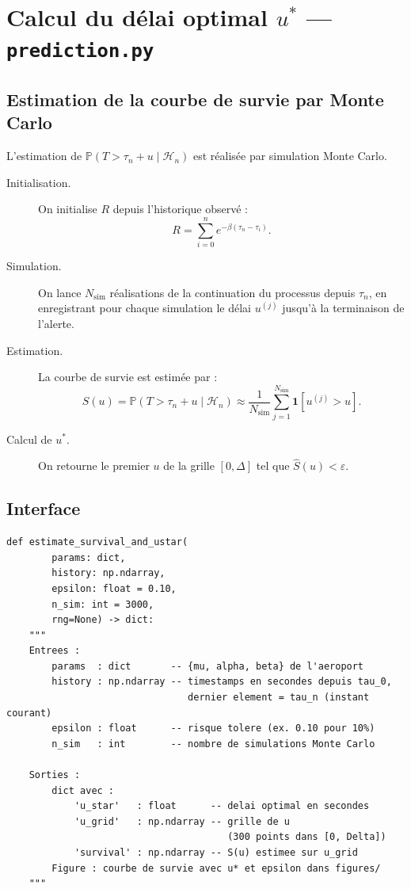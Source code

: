 \documentclass[a4paper,11pt]{article}
\begin{document}
\section{Calcul du délai optimal $u^*$ --- \texttt{prediction.py}}

\subsection{Estimation de la courbe de survie par Monte Carlo}

L'estimation de $\mathbb{P}(T > \tau_n + u \mid \mathcal{H}_n)$ est réalisée par simulation Monte Carlo.

\begin{description}
    \item[Initialisation.] On initialise $R$ depuis l'historique observé :
    \[
    R = \sum_{i=0}^{n} e^{-\beta(\tau_n - \tau_i)}.
    \]
    \item[Simulation.] On lance $N_{\text{sim}}$ réalisations de la continuation du processus depuis $\tau_n$, en enregistrant pour chaque simulation le délai $u^{(j)}$ jusqu'à la terminaison de l'alerte.
    \item[Estimation.] La courbe de survie est estimée par :
    \[
    \hat{S}(u) = \mathbb{P}(T > \tau_n + u \mid \mathcal{H}_n) \approx \frac{1}{N_{\text{sim}}} \sum_{j=1}^{N_{\text{sim}}} \mathbf{1}\left[u^{(j)} > u\right].
    \]
    \item[Calcul de $u^*$.] On retourne le premier $u$ de la grille $[0, \Delta]$ tel que $\hat{S}(u) < \varepsilon$.
\end{description}

\subsection{Interface}

\begin{lstlisting}
def estimate_survival_and_ustar(
        params: dict,
        history: np.ndarray,
        epsilon: float = 0.10,
        n_sim: int = 3000,
        rng=None) -> dict:
    """
    Entrees :
        params  : dict       -- {mu, alpha, beta} de l'aeroport
        history : np.ndarray -- timestamps en secondes depuis tau_0,
                                dernier element = tau_n (instant courant)
        epsilon : float      -- risque tolere (ex. 0.10 pour 10%)
        n_sim   : int        -- nombre de simulations Monte Carlo

    Sorties :
        dict avec :
            'u_star'   : float      -- delai optimal en secondes
            'u_grid'   : np.ndarray -- grille de u 
                                       (300 points dans [0, Delta])
            'survival' : np.ndarray -- S(u) estimee sur u_grid
        Figure : courbe de survie avec u* et epsilon dans figures/
    """
\end{lstlisting}
\end{document}
